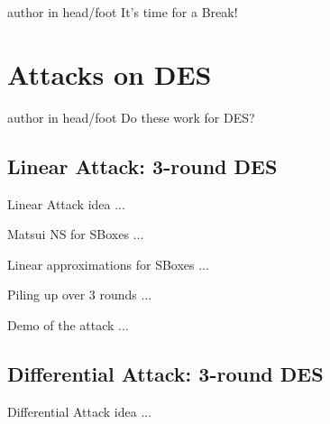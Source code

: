 \documentclass[9pt]{beamer}
\begin{document}
\begin{frame}
\begin{beamercolorbox}[ht=2.5ex,dp=1.125ex,center,rounded=true,shadow=true]{author in head/foot}
It's time for a Break!
\end{beamercolorbox}
\end{frame}


\section{Attacks on DES}
\begin{frame}
\begin{beamercolorbox}[ht=2.5ex,dp=1.125ex,center,rounded=true,shadow=true]{author in head/foot}
Do these work for DES?
\end{beamercolorbox}
\end{frame}

\subsection{Linear Attack: 3-round DES}
\begin{frame}
Linear Attack idea ...

\end{frame}

\begin{frame}
Matsui NS for SBoxes ...

\end{frame}

\begin{frame}
Linear approximations for SBoxes ...

\end{frame}

\begin{frame}
Piling up over 3 rounds ...

\end{frame}

\begin{frame}
Demo of the attack ...

\end{frame}

\subsection{Differential Attack: 3-round DES}
\begin{frame}
Differential Attack idea ...

\end{frame}
\end{document}

